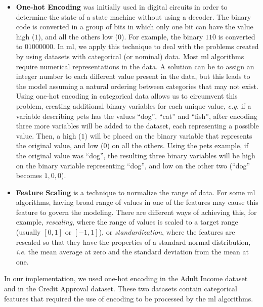 \begin{itemize}
    

	\item\textbf{One-hot Encoding}\cite{harris2010digital} was initially used in digital circuits in order to determine the state of a state machine without using a decoder. The binary code is converted in a group of bits in which only one bit can have the value high ($1$), and all the others low ($0$). For example, the binary $110$ is converted to $01000000$.
	In \ac{ml}, we apply this technique to deal with the problems created by using datasets with categorical (or nominal) data. Most \ac{ml} algorithms require numerical representations in the data. A solution can be to assign an integer number to each different value present in the data, but this leads to the model assuming a natural ordering between categories that may not exist.
	Using one-hot encoding in categorical data allows us to circumvent this problem, creating additional binary variables for each unique value, \textit{e.g.} if a variable describing pets has the values ``dog'', ``cat'' and ``fish'', after encoding three more variables will be added to the dataset, each representing a possible value. Then, a high ($1$) will be placed on the binary variable that represents the original value, and low ($0$) on all the others. Using the pets example, if the original value was ``dog'', the resulting three binary variables will be high on the binary variable representing ``dog'', and low on the other two (``dog'' becomes $1,0,0$).

	\item\textbf{Feature Scaling} is a technique to normalize the range of data. For some \ac{ml} algorithms, having broad range of values in one of the features may cause this feature to govern the modeling. There are different ways of achieving this, for example, \textit{rescaling}, where the range of values is scaled to a target range (usually $[0,1]$ or $[-1,1]$), or \textit{standardization}, where the features are rescaled so that they have the properties of a standard normal distribution, \textit{i.e.} the mean average at zero and the standard deviation from the mean at one.



\end{itemize}

In our implementation, we used one-hot encoding in the Adult Income dataset and in the Credit Approval dataset. These two datasets contain categorical features that required the use of encoding to be processed by the \ac{ml} algorithms.

